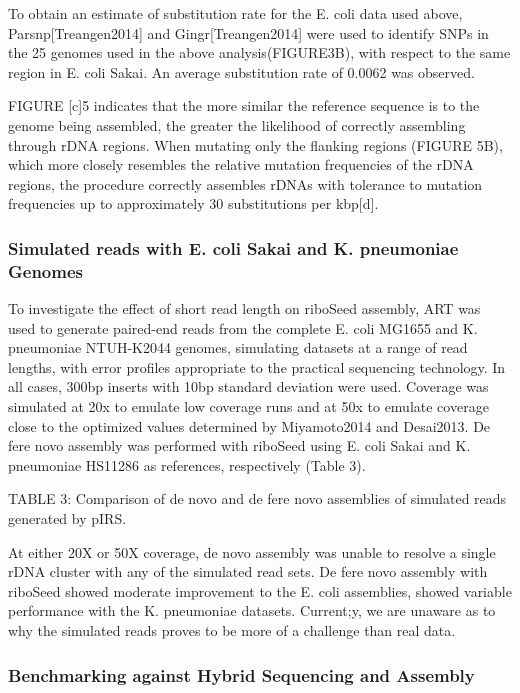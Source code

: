 \documentclass[11pt]{article}
\begin{document}
\begin{linenumbers}
To obtain an estimate of substitution rate for the E. coli data used above, Parsnp[Treangen2014] and Gingr[Treangen2014] were used to identify SNPs in the 25 genomes used in the above analysis(FIGURE3B), with respect to the same region in E. coli Sakai. An average substitution rate of 0.0062 was observed.


FIGURE [c]5 indicates that the more similar the reference sequence is to the genome being assembled, the greater the likelihood of correctly assembling through rDNA regions. When mutating only the flanking regions (FIGURE 5B), which more closely resembles the relative mutation frequencies of the rDNA regions, the procedure correctly assembles rDNAs with tolerance to mutation frequencies up to approximately 30 substitutions per kbp[d].

\subsubsection*{Simulated reads with E. coli Sakai and K. pneumoniae Genomes}


To investigate the effect of short read length on riboSeed assembly, ART was used to generate paired-end reads from the complete E. coli MG1655 and K. pneumoniae NTUH-K2044 genomes, simulating datasets at a range of read lengths, with error profiles appropriate to the practical sequencing technology. In all cases, 300bp inserts with 10bp standard deviation were used. Coverage was simulated at 20x to emulate low coverage runs and at 50x to emulate coverage close to the optimized values determined by Miyamoto2014 and Desai2013. De fere novo assembly was performed with riboSeed using E. coli Sakai and K. pneumoniae HS11286 as references, respectively (Table 3).


TABLE 3:
Comparison of de novo and de fere novo assemblies of simulated reads generated by pIRS.



At either 20X or 50X coverage, de novo assembly was unable to resolve a single rDNA cluster with any of the simulated read sets. De fere novo assembly with riboSeed showed moderate improvement to the E. coli assemblies, showed variable performance with the K. pneumoniae datasets. Current;y, we are unaware as to why the simulated reads proves to be more of a challenge than real data.

\subsubsection*{Benchmarking against Hybrid Sequencing and Assembly}


\end{linenumbers}
\end{document}
